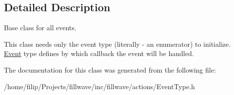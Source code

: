 \subsection{Detailed Description}
Base class for all events. 

This class needs only the event type (literally -\/ an enumerator) to initialize. \hyperlink{classfillwave_1_1actions_1_1Event}{Event} type defines by which callback the event will be handled. 

The documentation for this class was generated from the following file\+:\begin{DoxyCompactItemize}
\item 
/home/filip/\+Projects/fillwave/inc/fillwave/actions/Event\+Type.\+h\end{DoxyCompactItemize}

